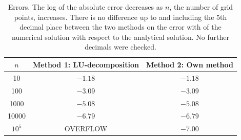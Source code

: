 \documentclass[11pt]{article}
\begin{document}
		\begin{table}[h]
			\begin{center}
				\caption{Errors. The log of the absolute error decreases as $n$, the number of grid points, increases. There is no difference up to and including the 5th decimal place between the two methods on the error with of the numerical solution with respect to the analytical solution. No further decimals were checked.}
				\label{table errors}
				\begin{tabular}{|c|c|c|}
					\hline
					$n$		&	Method 1: LU-decomposition	&	Method 2: Own method		\\ \hline
					10			&	$-1.18$										&	$-1.18$									\\
					100		&	$-3.09$										&	$-3.09$									\\
					1000		&	$-5.08$										&	$-5.08$									\\
					10000	&	$-6.79$										&	$-6.79$									\\
					$10^5$	&	OVERFLOW							&	$-7.00$									\\ \hline
				\end{tabular}
			\end{center}
		\end{table}
		
\end{document}
